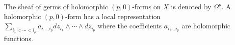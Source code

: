 The sheaf of germs of holomorphic $(p, 0)$-forms on $X$ is denoted by $\Omega^p$. A holomorphic $(p,0)$-form has a local representation $\sum_{i_1 < \cdots < i_p} a_{i_1\ldots i_p} dz_{i_1} \wedge \cdots \wedge dz_{i_p}$ where the coefficients $a_{i_1\ldots i_p}$ are holomorphic functions.
